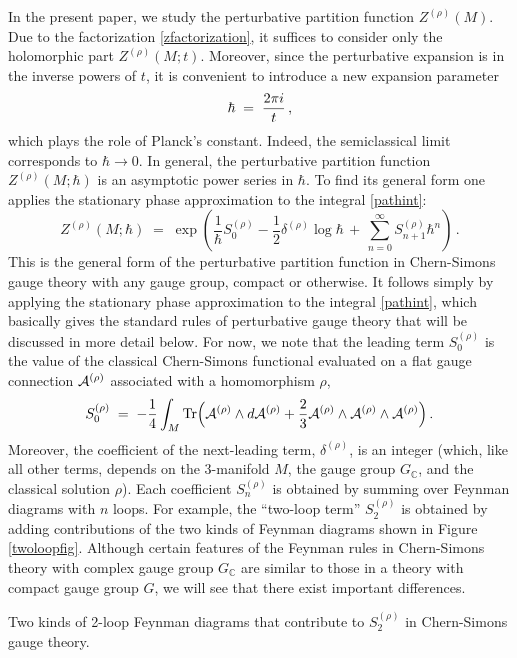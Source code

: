 \documentclass[hyper]{JHEP3}
\def\Tr{{\rm Tr}}
\def\CA {{\cal A}}
\newcommand{\C}{{\mathbb{C}}}
\newcommand\be{\begin{equation}}
\newcommand\ee{\end{equation}}
\def\={\;=\;}
\begin{document}
In the present paper, we study the perturbative partition
function $Z^{(\rho)} (M)$. Due to the factorization \eqref{zfactorization},
it suffices to consider only the holomorphic part $Z^{(\rho)} (M;t)$.
Moreover, since the perturbative expansion is in the inverse
powers of $t$, it is convenient to introduce a new expansion parameter
\be
\hbar \= {2 \pi i \over t}\,,
\label{hbdef}
\ee
which plays the role of Planck's constant.
Indeed, the semiclassical limit corresponds to $\hbar \to 0$.
In general, the perturbative partition function $Z^{(\rho)} (M;\hbar)$
is an asymptotic power series in $\hbar$. To find its general form
one applies the stationary phase approximation to the integral \eqref{pathint}:
\be\label{zpert}
Z^{(\rho)} (M;\hbar)
 \= \exp\left( \frac{1}{\hbar} S_0^{(\rho)} - \frac{1}{2}\delta^{(\rho)} \log \hbar
 \,+\,\sum_{n=0}^\infty S_{n+1}^{(\rho)} \hbar^n \right)\,.
\ee
This is the general form of the perturbative partition function in
Chern-Simons gauge theory with any gauge group, compact or otherwise.
It follows simply by applying the stationary phase approximation
to the integral \eqref{pathint}, which basically gives the standard
rules of perturbative gauge theory \cite{witten-1989,as-1992,barnatan-1991,barnatan-1991w}
that will be discussed in more detail below.
For now, we note that the leading term $S_0^{(\rho)}$ is the value
of the classical Chern-Simons functional evaluated on a flat gauge
connection $\CA^{(\rho)}$ associated with a homomorphism $\rho$,
\be
S_0^{(\rho)} \= - {1 \over 4} \int_M \Tr
\Big( \CA^{(\rho)} \wedge d \CA^{(\rho)}
+ {2 \over 3} \CA^{(\rho)} \wedge \CA^{(\rho)} \wedge \CA^{(\rho)} \Big)\,.
\label{szero}
\ee
Moreover, the coefficient of the next-leading term, $\delta^{(\rho)}$,
is an integer (which, like all other terms, depends on the 3-manifold $M$,
the gauge group $G_{\C}$, and the classical solution $\rho$).
Each coefficient $S_{n}^{(\rho)}$ is obtained by summing over
Feynman diagrams with $n$ loops.
For example, the ``two-loop term'' $S_2^{(\rho)}$ is obtained by
adding contributions of the two kinds of Feynman diagrams shown in Figure \ref{twoloopfig}.
Although certain features of the Feynman rules in Chern-Simons theory
with complex gauge group $G_{\C}$ are similar to those in a theory with
compact gauge group $G$, we will see that there exist important differences.

%
{Two kinds of 2-loop Feynman diagrams that contribute to $S_{2}^{(\rho)}$
in Chern-Simons gauge theory.
\label{twoloopfig} }
\end{document}
